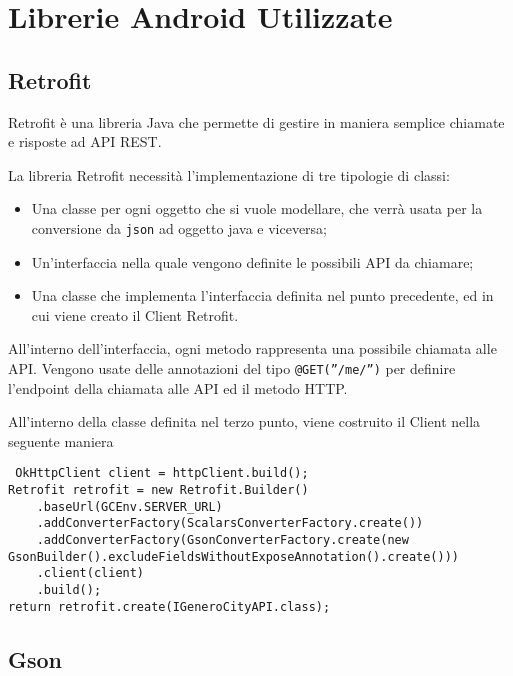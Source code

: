 \hypertarget{librerie-android-utilizzate}{%
\section{Librerie Android Utilizzate}\label{librerie-android-utilizzate}}

\hypertarget{retrofit}{%
\subsection{Retrofit}\label{retrofit}}

Retrofit è una libreria Java che permette di gestire in maniera semplice chiamate e risposte ad API REST.

La libreria Retrofit necessità l'implementazione di tre tipologie di classi:

\begin{itemize}
    \item Una classe per ogni oggetto che si vuole modellare, che verrà usata per la conversione da \texttt{json} ad oggetto java e viceversa;
    \item Un'interfaccia nella quale vengono definite le possibili API da chiamare;
    \item Una classe che implementa l'interfaccia definita nel punto precedente, ed in cui viene creato il Client Retrofit.
\end{itemize}
All'interno dell'interfaccia, ogni metodo rappresenta una possibile chiamata alle API. Vengono usate delle annotazioni del tipo
\texttt{@GET(”/me/”)} per definire l'endpoint della chiamata alle API ed il metodo HTTP. \cite{retrofit}

All'interno della classe definita nel terzo punto, viene costruito il Client nella seguente maniera

\begin{lstlisting} OkHttpClient client = httpClient.build(); 
Retrofit retrofit = new Retrofit.Builder()  
    .baseUrl(GCEnv.SERVER_URL)  
    .addConverterFactory(ScalarsConverterFactory.create())  
    .addConverterFactory(GsonConverterFactory.create(new GsonBuilder().excludeFieldsWithoutExposeAnnotation().create()))  
    .client(client) 
    .build();
return retrofit.create(IGeneroCityAPI.class);
\end{lstlisting}


\hypertarget{gson}{%
\subsection{Gson}\label{gson}}

